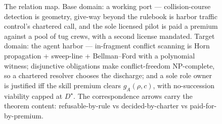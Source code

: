 \begin{figure}[t]
\caption{The relation map. Base domain: a working port --- collision-course detection is geometry, give-way beyond the rulebook is
harbor traffic control's chartered call, and the sole licensed pilot is paid a premium against a pool of tug crews, with a second
license mandated. Target domain: the agent harbor --- in-fragment conflict scanning is Horn propagation + sweep-line +
Bellman--Ford with a polynomial witness; disjunctive obligations make conflict-freedom NP-complete, so a chartered resolver
chooses the discharge; and a sole role owner is justified iff the skill premium clears $g_A(\rho,c)$, with no-succession viability
capped at $D^\star$. The correspondence arrows carry the theorem content: refusable-by-rule vs decided-by-charter vs
paid-for-by-premium.}
\label{fig:relation}
\end{figure}
